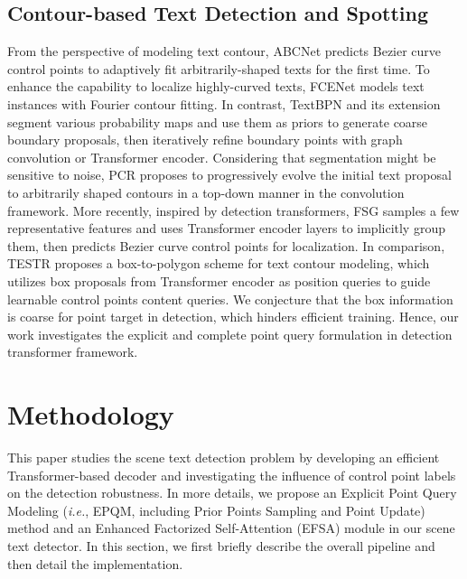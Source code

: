 \documentclass[letterpaper]{article} \usepackage{aaai23}  \usepackage{times}  \usepackage{helvet}  \usepackage{courier}  \usepackage[hyphens]{url}  \usepackage{graphicx} \urlstyle{rm}
\begin{document}
\subsection{Contour-based Text Detection and Spotting}
From the perspective of modeling text contour, ABCNet \cite{liu2020abcnet} predicts Bezier curve control points to adaptively fit arbitrarily-shaped texts for the first time. To enhance the capability to localize highly-curved texts, FCENet \cite{zhu2021fourier} models text instances with  Fourier contour fitting. In contrast, TextBPN and its extension \cite{zhang2021adaptive,zhang2022arbitrary} segment various probability maps and use them as priors to generate coarse boundary proposals, then iteratively refine boundary points with graph convolution or Transformer encoder. Considering that segmentation might be sensitive to noise, PCR \cite{dai2021progressive} proposes to progressively evolve the initial text proposal to arbitrarily shaped contours in a top-down manner in the convolution framework. More recently, inspired by detection transformers, FSG\cite{tang2022few} samples a few representative features and uses Transformer encoder layers to implicitly group them, then predicts Bezier curve control points for localization. In comparison, TESTR \cite{zhang2022text} proposes a box-to-polygon scheme for text contour modeling, which utilizes box proposals from Transformer encoder as position queries to guide learnable control points content queries. We conjecture that the box information is coarse for point target in detection, which hinders efficient training. Hence, our work investigates the explicit and complete point query formulation in detection transformer framework.



\section{Methodology}
\label{sec:method}
This paper studies the scene text detection problem by developing an efficient Transformer-based decoder and investigating the influence of control point labels on the detection robustness.
In more details, we propose an Explicit Point Query Modeling (\emph{i.e.}, EPQM, including Prior Points Sampling and Point Update) method and an Enhanced Factorized Self-Attention (EFSA) module in our scene text detector. In this section, we first briefly describe the overall pipeline and then detail the implementation.
\end{document}
